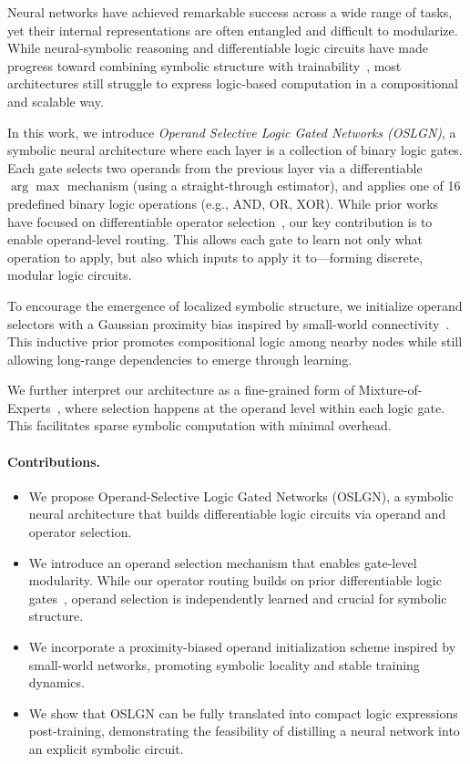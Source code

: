 Neural networks have achieved remarkable success across a wide range of tasks, yet their internal representations are often entangled and difficult to modularize. While neural-symbolic reasoning and differentiable logic circuits have made progress toward combining symbolic structure with trainability~\cite{petersen2022deep, manhaeve2018deepproblog}, most architectures still struggle to express logic-based computation in a compositional and scalable way.

In this work, we introduce \textit{Operand Selective Logic Gated Networks (OSLGN)}, a symbolic neural architecture where each layer is a collection of binary logic gates. Each gate selects two operands from the previous layer via a differentiable $\arg\max$ mechanism (using a straight-through estimator), and applies one of 16 predefined binary logic operations (e.g., AND, OR, XOR). While prior works have focused on differentiable operator selection~\cite{petersen2022deep}, our key contribution is to enable operand-level routing. This allows each gate to learn not only what operation to apply, but also which inputs to apply it to—forming discrete, modular logic circuits.

To encourage the emergence of localized symbolic structure, we initialize operand selectors with a Gaussian proximity bias inspired by small-world connectivity~\cite{watts1998collective, javaheripi2019swnet}. This inductive prior promotes compositional logic among nearby nodes while still allowing long-range dependencies to emerge through learning.

We further interpret our architecture as a fine-grained form of Mixture-of-Experts~\cite{shazeer2017outrageously}, where selection happens at the operand level within each logic gate. This facilitates sparse symbolic computation with minimal overhead.

\paragraph{Contributions.}
\begin{itemize}
    \item We propose Operand-Selective Logic Gated Networks (OSLGN), a symbolic neural architecture that builds differentiable logic circuits via operand and operator selection.
    
    \item We introduce an operand selection mechanism that enables gate-level modularity. While our operator routing builds on prior differentiable logic gates~\cite{petersen2022deep}, operand selection is independently learned and crucial for symbolic structure.
    
    \item We incorporate a proximity-biased operand initialization scheme inspired by small-world networks, promoting symbolic locality and stable training dynamics.
    
    \item We show that OSLGN can be fully translated into compact logic expressions post-training, demonstrating the feasibility of distilling a neural network into an explicit symbolic circuit.
\end{itemize}
